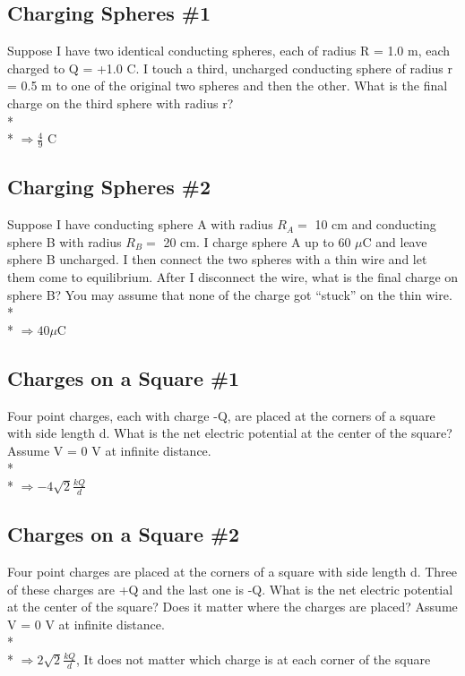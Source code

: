 \documentclass[11pt]{article}
\begin{document}
\subsection{Charging Spheres \#1}
Suppose I have two identical conducting spheres, each of radius R = 1.0 m, each charged to Q = +1.0 C.  I touch a third, uncharged conducting sphere of radius r = 0.5 m to one of the original two spheres and then the other.  What is the final charge on the third sphere with radius r?\\* \\*
$\Rightarrow \frac{4}{9}$ C

\subsection{Charging Spheres \#2}
Suppose I have conducting sphere A with radius $R_A=$ 10 cm and conducting sphere B with radius $R_B=$ 20 cm.  I charge sphere A up to 60 $\mu$C and leave sphere B uncharged.  I then connect the two spheres with a thin wire and let them come to equilibrium.  After I disconnect the wire, what is the final charge on sphere B?  You may assume that none of the charge got “stuck” on the thin wire.\\* \\*
$\Rightarrow 40 \mu$C

\subsection{Charges on a Square \#1}
Four point charges, each with charge -Q, are placed at the corners of a square with side length d.  What is the net electric potential at the center of the square?  Assume V = 0 V at infinite distance.\\* \\*
$\Rightarrow -4 \sqrt{2} \frac{kQ}{d}$

\subsection{Charges on a Square \#2}
Four point charges are placed at the corners of a square with side length d.  Three of these charges are +Q and the last one is -Q.  What is the net electric potential at the center of the square?  Does it matter where the charges are placed?  Assume V = 0 V at infinite distance.\\* \\*
$\Rightarrow 2 \sqrt{2} \frac{kQ}{d}$, It does not matter which charge is at each corner of the square
\end{document}
